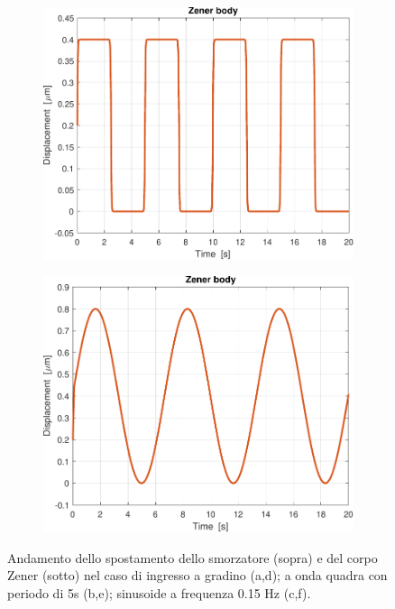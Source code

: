 \begin{figure}[t!]
\begin{subfigure}{0.33\linewidth}
		\includegraphics[width=0.95\linewidth]{../code/figs/square_zener_}
		\caption{}
	\end{subfigure}\hfill
	\begin{subfigure}{0.33\linewidth}
		\centering
		\includegraphics[width=0.95\linewidth]{../code/figs/harmonic_zener_}
		\caption{}
	\end{subfigure}\hfill
	\caption{Andamento dello spostamento dello smorzatore (sopra) e del corpo Zener (sotto) nel caso di ingresso a gradino (a,d); a onda quadra con periodo di 5s (b,e); sinusoide a frequenza 0.15 Hz (c,f).}
\end{figure}

